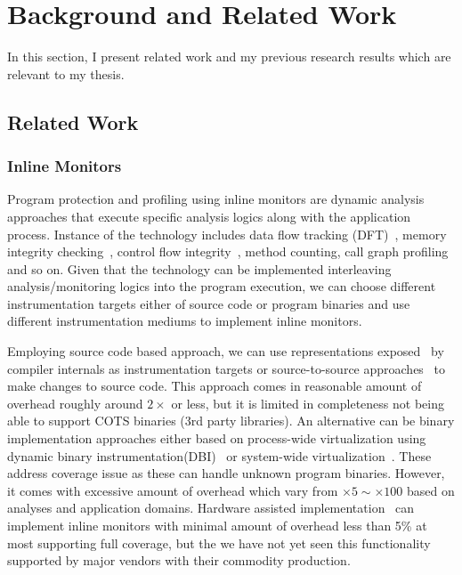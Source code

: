 \section{Background and Related Work}
\label{sec:related}

In this section, I present related work and my previous research results
which are relevant to my thesis.

\subsection{Related Work}

\subsubsection{Inline Monitors}
\label{ssec:inline}

Program protection and profiling using inline monitors are dynamic analysis
approaches that execute specific analysis logics along with the application
process. Instance of the technology includes data flow tracking
(DFT)~\cite{DFT}, memory integrity checking~\cite{memcheck}, control flow
integrity~\cite{cfi}, method counting, call graph profiling and so on.
Given that the technology can be implemented interleaving analysis/monitoring
logics into the program execution, we can choose different instrumentation
targets either of source code or program binaries and use different
instrumentation mediums to implement inline monitors.

Employing source code based approach, we can use representations
exposed~\cite{AST,LLVM-IR} by compiler internals as instrumentation targets or
source-to-source approaches~\cite{txl, cil} to make changes to source code.
This approach comes in reasonable amount of overhead roughly around $2\times$
or less, but it is limited in completeness not being able to support COTS
binaries (\ie 3rd party libraries).  An alternative can be binary
implementation approaches either based on process-wide virtualization using
dynamic binary instrumentation(DBI)~\cite{PIN, dynamoRIO, valgrind} or
system-wide virtualization~\cite{qemu,xen}. These address coverage issue as
these can handle unknown program binaries. However, it comes with excessive
amount of overhead which vary from $\times 5 \sim \times 100$ based on analyses
and application domains. Hardware assisted implementation~\cite{HARD, lba} can
implement inline monitors with minimal amount of overhead less than 5\% at most
supporting full coverage, but the we have not yet seen this functionality
supported by major vendors with their commodity production.

